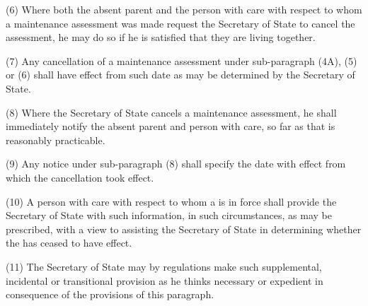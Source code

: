 \documentclass[a4paper]{article}
\begin{document}
{(6)
Where both the absent parent and the person with care with respect to whom a maintenance assessment was made request the Secretary of State to cancel the assessment, he may do so if he is satisfied that they are living together.

(7)
Any cancellation of a maintenance assessment under sub-paragraph (4A), (5) or (6) shall have effect from such date as may be determined by the Secretary of State.

(8)
Where the Secretary of State cancels a maintenance assessment, he shall immediately notify the absent parent and person with care, so far as that is reasonably practicable.

(9)
Any notice under sub-paragraph (8) shall specify the date with effect from which the cancellation took effect.

}

(10) A person with care with respect to whom a  is in force shall provide the Secretary of State with such information, in such circumstances, as may be prescribed, with a view to assisting the Secretary of State in determining whether the  has ceased to have effect.

(11) The Secretary of State may by regulations make such supplemental, incidental or transitional provision as he thinks necessary or expedient in consequence of the provisions of this paragraph.
\end{document}
